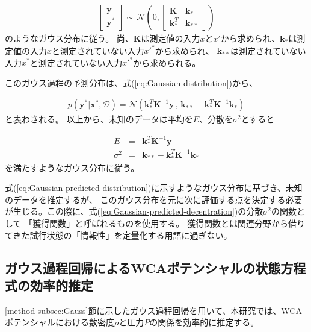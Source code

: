 \documentclass[titlepage]{jsreport}
\begin{document}
{{{\large
\begin{eqnarray}
    \left[
        \begin{array}{l}
            \bm{y} \\
            \bm{y}^* 
        \end{array}
    \right]
    {\sim}\,{\mathcal{N}}
    \left(0,
        \left[
            \begin{array}{cc}
                \bm{K} & \bm{k}_*\\    
                \bm{k}_*^T & \bm{k}_{**}
            \end{array}
        \right]
    \right) \label{eq:Gaussian-distribution}
\end{eqnarray}
\normalsize
のようなガウス分布に従う。
尚、$\bm{K}$は測定値の入力$x$と$x'$から求められ、$\bm{k}_*$は測定値の入力$x$と測定されていない入力$x'^*$から求められ、
$\bm{k}_{**}$は測定されていない入力$x^*$と測定されていない入力$x'^*$から求められる。

このガウス過程の予測分布は、式(\ref{eq:Gaussian-distribution})から、

\large
\begin{eqnarray}
p(\bm{y}^*|\bm{x}^*,\mathcal{D})
={\mathcal{N}}(\bm{k}_*^T\bm{K}^{-1}\bm{y}\,,\,\bm{k}_{**}-\bm{k}_*^T\bm{K}^{-1}\bm{k}_*)  \label{eq:Gaussian-predicted-distribution}
\end{eqnarray}
\normalsize
と表わされる。
以上から、未知のデータは平均を$E$、分散を$\sigma^2$とすると

\large
\begin{eqnarray}
    E&=&\bm{k}_*^T\bm{K}^{-1}\bm{y}\\ \label{eq:Gaussian-predicted-average}
    \sigma^2&=&\bm{k}_{**}-\bm{k}_*^T\bm{K}^{-1}\bm{k}_* \label{eq:Gaussian-predicted-decentration}
\end{eqnarray}
\normalsize
を満たすようなガウス分布に従う\cite{Gauss-machine-learning}。

式(\ref{eq:Gaussian-predicted-distribution})に示すようなガウス分布に基づき、未知のデータを推定するが、
このガウス分布を元に次に評価する点を決定する必要が生じる。この際に、式(\ref{eq:Gaussian-predicted-decentration})の分散$\sigma^2$の関数として
「獲得関数」と呼ばれるものを使用する。
獲得関数とは関連分野から借りてきた試行状態の「情報性」を定量化する用語に過ぎない\cite{acquisition-function}。


\subsection{ガウス過程回帰によるWCAポテンシャルの状態方程式の効率的推定}\label{method-subsec:Gaussian-estimation}
\ref{method-subsec:Gauss}節に示したガウス過程回帰を用いて、本研究では、WCAポテンシャルにおける数密度$\rho$と圧力$P$の関係を効率的に推定する。

}}}
\end{document}
